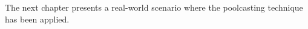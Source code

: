 The next chapter presents a real-world scenario where the poolcasting technique has been applied.








% 
% 
% 
% 
% 
% 
% 
% 
% 
% 
% 
% 
% 
% 


